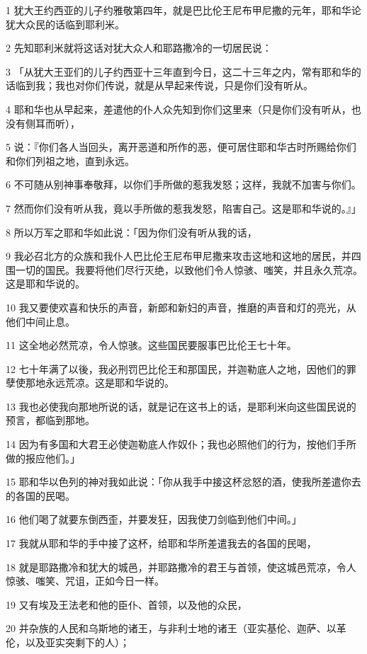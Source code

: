 \par 1 犹大王约西亚的儿子约雅敬第四年，就是巴比伦王尼布甲尼撒的元年，耶和华论犹大众民的话临到耶利米。
\par 2 先知耶利米就将这话对犹大众人和耶路撒冷的一切居民说：
\par 3 「从犹大王亚们的儿子约西亚十三年直到今日，这二十三年之内，常有耶和华的话临到我；我也对你们传说，就是从早起来传说，只是你们没有听从。
\par 4 耶和华也从早起来，差遣他的仆人众先知到你们这里来（只是你们没有听从，也没有侧耳而听），
\par 5 说：『你们各人当回头，离开恶道和所作的恶，便可居住耶和华古时所赐给你们和你们列祖之地，直到永远。
\par 6 不可随从别神事奉敬拜，以你们手所做的惹我发怒；这样，我就不加害与你们。
\par 7 然而你们没有听从我，竟以手所做的惹我发怒，陷害自己。这是耶和华说的。』」
\par 8 所以万军之耶和华如此说：「因为你们没有听从我的话，
\par 9 我必召北方的众族和我仆人巴比伦王尼布甲尼撒来攻击这地和这地的居民，并四围一切的国民。我要将他们尽行灭绝，以致他们令人惊骇、嗤笑，并且永久荒凉。这是耶和华说的。
\par 10 我又要使欢喜和快乐的声音，新郎和新妇的声音，推磨的声音和灯的亮光，从他们中间止息。
\par 11 这全地必然荒凉，令人惊骇。这些国民要服事巴比伦王七十年。
\par 12 七十年满了以後，我必刑罚巴比伦王和那国民，并迦勒底人之地，因他们的罪孽使那地永远荒凉。这是耶和华说的。
\par 13 我也必使我向那地所说的话，就是记在这书上的话，是耶利米向这些国民说的预言，都临到那地。
\par 14 因为有多国和大君王必使迦勒底人作奴仆；我也必照他们的行为，按他们手所做的报应他们。」
\par 15 耶和华以色列的神对我如此说：「你从我手中接这杯忿怒的酒，使我所差遣你去的各国的民喝。
\par 16 他们喝了就要东倒西歪，并要发狂，因我使刀剑临到他们中间。」
\par 17 我就从耶和华的手中接了这杯，给耶和华所差遣我去的各国的民喝，
\par 18 就是耶路撒冷和犹大的城邑，并耶路撒冷的君王与首领，使这城邑荒凉，令人惊骇、嗤笑、咒诅，正如今日一样。
\par 19 又有埃及王法老和他的臣仆、首领，以及他的众民，
\par 20 并杂族的人民和乌斯地的诸王，与非利士地的诸王（亚实基伦、迦萨、以革伦，以及亚实突剩下的人）；
